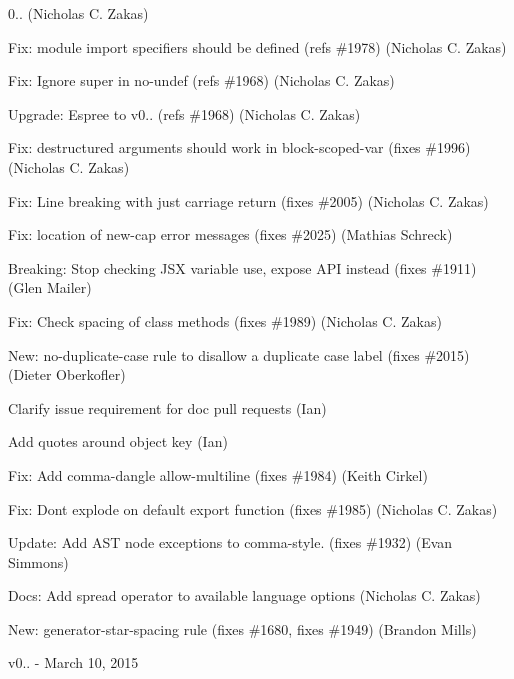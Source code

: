 \begin{DoxyItemize}
\item 0.. (Nicholas C. Zakas)
\item Fix\+: module import specifiers should be defined (refs \#1978) (Nicholas C. Zakas)
\item Fix\+: Ignore super in no-\/undef (refs \#1968) (Nicholas C. Zakas)
\item Upgrade\+: Espree to v0.. (refs \#1968) (Nicholas C. Zakas)
\item Fix\+: destructured arguments should work in block-\/scoped-\/var (fixes \#1996) (Nicholas C. Zakas)
\item Fix\+: Line breaking with just carriage return (fixes \#2005) (Nicholas C. Zakas)
\item Fix\+: location of new-\/cap error messages (fixes \#2025) (Mathias Schreck)
\item Breaking\+: Stop checking J\+SX variable use, expose A\+PI instead (fixes \#1911) (Glen Mailer)
\item Fix\+: Check spacing of class methods (fixes \#1989) (Nicholas C. Zakas)
\item New\+: no-\/duplicate-\/case rule to disallow a duplicate case label (fixes \#2015) (Dieter Oberkofler)
\item Clarify issue requirement for doc pull requests (Ian)
\item Add quotes around object key (Ian)
\item Fix\+: Add comma-\/dangle allow-\/multiline (fixes \#1984) (Keith Cirkel)
\item Fix\+: Don\textquotesingle{}t explode on default export function (fixes \#1985) (Nicholas C. Zakas)
\item Update\+: Add A\+ST node exceptions to comma-\/style. (fixes \#1932) (Evan Simmons)
\item Docs\+: Add spread operator to available language options (Nicholas C. Zakas)
\item New\+: generator-\/star-\/spacing rule (fixes \#1680, fixes \#1949) (Brandon Mills)
\end{DoxyItemize}

v0.. -\/ March 10, 2015


